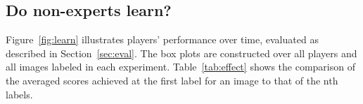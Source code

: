 \subsection{Do non-experts learn?}
Figure~\ref{fig:learn} illustrates players' performance over time, evaluated as described in Section~\ref{sec:eval}.
The box plots are constructed over all players and all images labeled in each experiment. 
Table~\ref{tab:effect} shows the comparison of the averaged scores achieved 
at the first label for an image to that of  the nth labels. %
%
%
%
\begin{table}[h!]
\centering
{}
\caption{The impact of learning over time. 
Wilcoxon rank-sum test is used for significance testing.
All comparisons are between the first label and the $nth$ label.}
\label{tab:effect}
\end{table}
